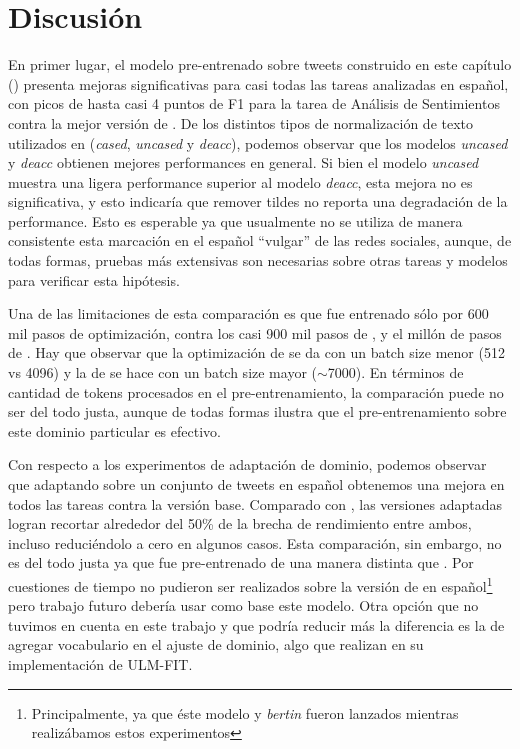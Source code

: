 \section{Discusión}


En primer lugar, el modelo pre-entrenado sobre tweets construido en este capítulo (\robertuito{}) presenta mejoras significativas para casi todas las tareas analizadas en español, con picos de hasta casi 4 puntos de F1 para la tarea de Análisis de Sentimientos contra la mejor versión de \beto{}. De los distintos tipos de normalización de texto utilizados en \robertuito{} (\emph{cased}, \emph{uncased} y \emph{deacc}), podemos observar que los modelos \emph{uncased} y \emph{deacc} obtienen mejores performances en general. Si bien el modelo \emph{uncased} muestra una ligera performance superior al modelo \emph{deacc}, esta mejora no es significativa, y esto indicaría que remover tildes no reporta una degradación de la performance. Esto es esperable ya que usualmente no se utiliza de manera consistente esta marcación en el español ``vulgar'' de las redes sociales, aunque, de todas formas, pruebas más extensivas son necesarias sobre otras tareas y modelos para verificar esta hipótesis.


Una de las limitaciones de esta comparación es que \robertuito{} fue entrenado sólo por 600 mil pasos de optimización, contra los casi 900 mil pasos de \beto{}, y el millón de pasos de \bertweet{}. Hay que observar que la optimización de \beto{} se da con un batch size menor (512 vs \num{4096}) y la de \bertweet{} se hace con un batch size mayor ($\sim$\num{7000}). En términos de cantidad de tokens procesados en el pre-entrenamiento, la comparación puede no ser del todo justa, aunque de todas formas ilustra que el pre-entrenamiento sobre este dominio particular es efectivo.

Con respecto a los experimentos de adaptación de dominio, podemos observar que adaptando \beto{} sobre un conjunto de tweets en español obtenemos una mejora en todos las tareas contra la versión base. Comparado con \robertuito{}, las versiones adaptadas logran recortar alrededor del 50\% de la brecha de rendimiento entre ambos, incluso reduciéndolo a cero en algunos casos. Esta comparación, sin embargo, no es del todo justa ya que \beto{} fue pre-entrenado de una manera distinta que \robertuito{}. Por cuestiones de tiempo no pudieron ser realizados sobre la versión de \roberta{} en español\footnote{Principalmente, ya que éste modelo y \emph{bertin} fueron lanzados mientras realizábamos estos experimentos} pero trabajo futuro debería usar como base este modelo. Otra opción que no tuvimos en cuenta en este trabajo y que podría reducir más la diferencia es la de agregar vocabulario en el ajuste de dominio, algo que \citet{howard-ruder-2018-universal} realizan en su implementación de ULM-FIT.

